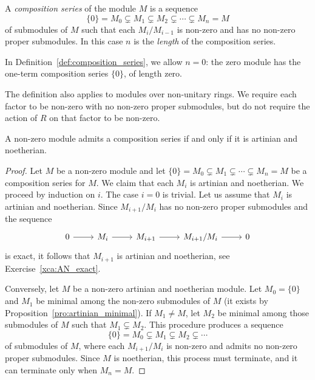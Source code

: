 \begin{definition}
\label{def:composition_series}
	A \emph{composition series} of the module $M$ is a sequence 
	\[
		\{0\}=M_0\subsetneq M_1\subsetneq M_2\subsetneq\cdots\subsetneq M_n=M
	\]
	of submodules of $M$ such that each $M_i/M_{i-1}$ is non-zero and has no non-zero 
	proper submodules. 
	In this case 
	$n$ is the \emph{length} of the composition series.
\end{definition}

In Definition~\ref{def:composition_series}, we allow $n=0$: the zero module has the one-term composition series $\{0\}$, of length zero. 

The definition also applies to modules over non-unitary rings.
We require each factor to be non-zero with no non-zero proper
submodules, but do not require the action of $R$ on that factor to be non-zero.

\begin{theorem}
	\label{thm:serie_de_composicion}
	A non-zero module admits a composition series if and only if it is artinian and noetherian.
\end{theorem}

\begin{proof}	
	Let $M$ be a non-zero module and let $\{0\}=M_0\subsetneq
	M_1\subsetneq\cdots\subsetneq M_n=M$ be a composition series for $M$.
	We claim that each $M_i$ is artinian and noetherian. We proceed by induction on $i$. The case
	$i=0$ is trivial. Let us assume that $M_i$ is artinian and noetherian. Since 
	$M_{i+1}/M_{i}$ has no non-zero proper submodules and the sequence 
	\[
	\begin{tikzcd}
		0 \arrow{r}
		& M_i \arrow{r}
		& M_{i+1} \arrow{r}
		& M_{i+1}/M_i \arrow{r}
		& 0
	\end{tikzcd}
	\]
	is exact, it follows that 
	$M_{i+1}$ is artinian and noetherian, see Exercise~\ref{xca:AN_exact}. 

    Conversely, let $M$ be a non-zero  artinian and noetherian module. Let $M_0=\{0\}$ and 
    $M_1$ be minimal among the non-zero  submodules of $M$ (it exists by Proposition~\ref{pro:artinian_minimal}).
    If $M_1\ne M$, let 
	$M_2$ be minimal among those submodules of $M$ such that $M_1\subsetneq M_2$. This procedure
	produces a sequence 
	\[
		\{0\}=M_0\subsetneq M_1\subsetneq M_2\subsetneq\cdots
	\]
	of submodules of $M$, where each $M_{i+1}/M_i$ is non-zero and admits no non-zero
	proper submodules. Since $M$ is noetherian, this process must terminate, and it can
	terminate only when $M_n=M$. 
\end{proof}

